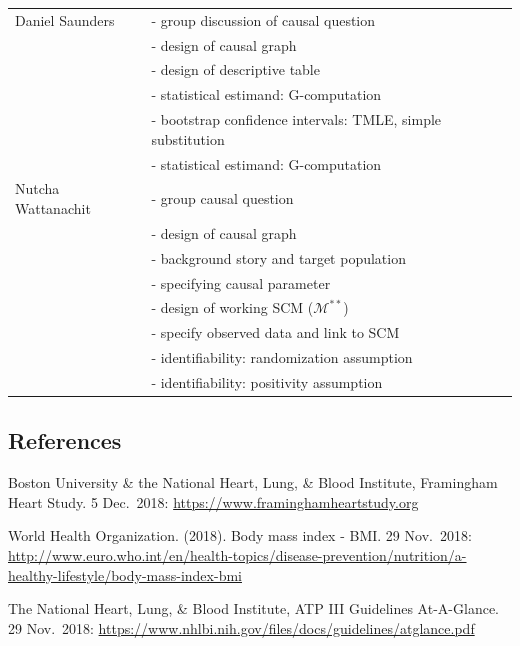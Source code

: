 \documentclass[]{article}
\begin{document}
\begin{table}[h!]
\begin{tabular}{|l|l|}
    Daniel Saunders & - group discussion of causal question \\
      & - design of causal graph \\
      & - design of descriptive table \\
      & - statistical estimand: G-computation \\
      & - bootstrap confidence intervals: TMLE, simple substitution\\ 
      & - statistical estimand: G-computation \\ \hline
    Nutcha Wattanachit & - group causal question \\
      & - design of causal graph \\
      & - background story and target population \\
      & - specifying causal parameter \\
      & - design of working SCM ($\mathcal{M}^{**}$) \\
      & - specify observed data and link to SCM \\
      & - identifiability: randomization assumption \\
      & - identifiability: positivity assumption \\ \hline
  \end{tabular}
\end{table}

\hypertarget{references}{%
\subsection{References}\label{references}}

Boston University \& the National Heart, Lung, \& Blood Institute,
Framingham Heart Study. 5 Dec.~2018:
\url{https://www.framinghamheartstudy.org}

World Health Organization. (2018). Body mass index - BMI. 29 Nov.~2018:
\url{http://www.euro.who.int/en/health-topics/disease-prevention/nutrition/a-healthy-lifestyle/body-mass-index-bmi}

The National Heart, Lung, \& Blood Institute, ATP III Guidelines
At-A-Glance. 29 Nov.~2018:
\url{https://www.nhlbi.nih.gov/files/docs/guidelines/atglance.pdf}
\end{document}
